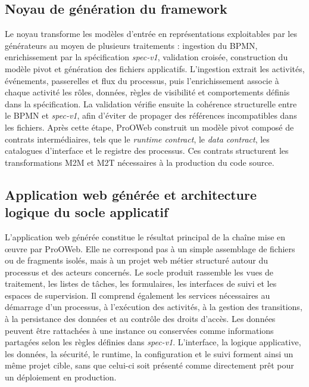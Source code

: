 \subsection{Noyau de génération du framework}

Le noyau transforme les modèles d’entrée en représentations exploitables par les
générateurs au moyen de plusieurs traitements : ingestion du BPMN,
enrichissement par la spécification \textit{spec-v1}, validation croisée,
construction du modèle pivot et génération des fichiers applicatifs. L’ingestion
extrait les activités, événements, passerelles et flux du processus, puis
l’enrichissement associe à chaque activité les rôles, données, règles de
visibilité et comportements définis dans la spécification. La validation vérifie
ensuite la cohérence structurelle entre le BPMN et \textit{spec-v1}, afin
d'éviter de propager des références incompatibles dans les fichiers. Après cette étape, ProOWeb
construit un modèle pivot composé de contrats intermédiaires, tels que le
\textit{runtime contract}, le \textit{data contract}, les catalogues d’interface
et le registre des processus. Ces contrats structurent les transformations M2M
et M2T nécessaires à la production du code source.

\subsection{Application web générée et architecture logique du socle applicatif}
\label{sec:chap3-architecture-application-cible}

L'application web générée constitue le résultat principal de la chaîne mise en
œuvre par ProOWeb. Elle ne correspond pas à un simple assemblage de fichiers ou
de fragments isolés, mais à un projet web métier structuré autour du processus et
des acteurs concernés. Le socle produit rassemble les vues de traitement, les
listes de tâches, les formulaires, les interfaces de suivi et les espaces de
supervision. Il comprend également les services nécessaires au démarrage d'un
processus, à l'exécution des activités, à la gestion des transitions, à la
persistance des données et au contrôle des droits d'accès. Les données peuvent
être rattachées à une instance ou conservées comme informations partagées selon
les règles définies dans \textit{spec-v1}. L'interface, la logique applicative,
les données, la sécurité, le runtime, la configuration et le suivi forment ainsi
un même projet cible, sans que celui-ci soit présenté comme directement prêt
pour un déploiement en production.

